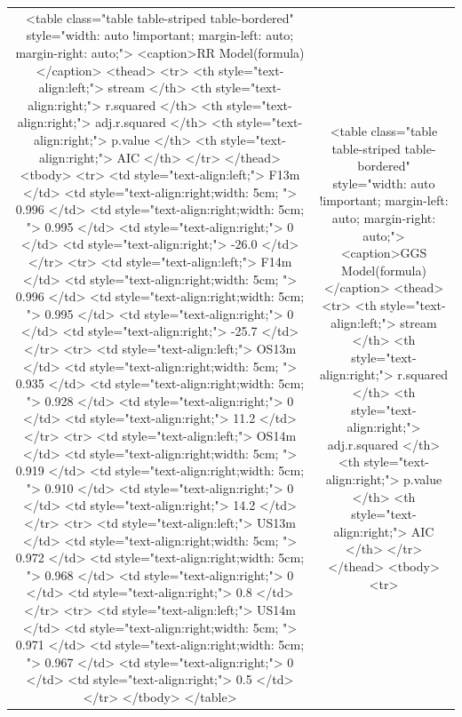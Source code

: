\documentclass[
]{article}
\begin{document}
\begin{center}\begin{tabular}{ c c }<table class="table table-striped table-bordered" style="width: auto !important; margin-left: auto; margin-right: auto;">
<caption>RR Model(formula)</caption>
 <thead>
  <tr>
   <th style="text-align:left;"> stream </th>
   <th style="text-align:right;"> r.squared </th>
   <th style="text-align:right;"> adj.r.squared </th>
   <th style="text-align:right;"> p.value </th>
   <th style="text-align:right;"> AIC </th>
  </tr>
 </thead>
<tbody>
  <tr>
   <td style="text-align:left;"> F13m </td>
   <td style="text-align:right;width: 5cm; "> 0.996 </td>
   <td style="text-align:right;width: 5cm; "> 0.995 </td>
   <td style="text-align:right;"> 0 </td>
   <td style="text-align:right;"> -26.0 </td>
  </tr>
  <tr>
   <td style="text-align:left;"> F14m </td>
   <td style="text-align:right;width: 5cm; "> 0.996 </td>
   <td style="text-align:right;width: 5cm; "> 0.995 </td>
   <td style="text-align:right;"> 0 </td>
   <td style="text-align:right;"> -25.7 </td>
  </tr>
  <tr>
   <td style="text-align:left;"> OS13m </td>
   <td style="text-align:right;width: 5cm; "> 0.935 </td>
   <td style="text-align:right;width: 5cm; "> 0.928 </td>
   <td style="text-align:right;"> 0 </td>
   <td style="text-align:right;"> 11.2 </td>
  </tr>
  <tr>
   <td style="text-align:left;"> OS14m </td>
   <td style="text-align:right;width: 5cm; "> 0.919 </td>
   <td style="text-align:right;width: 5cm; "> 0.910 </td>
   <td style="text-align:right;"> 0 </td>
   <td style="text-align:right;"> 14.2 </td>
  </tr>
  <tr>
   <td style="text-align:left;"> US13m </td>
   <td style="text-align:right;width: 5cm; "> 0.972 </td>
   <td style="text-align:right;width: 5cm; "> 0.968 </td>
   <td style="text-align:right;"> 0 </td>
   <td style="text-align:right;"> 0.8 </td>
  </tr>
  <tr>
   <td style="text-align:left;"> US14m </td>
   <td style="text-align:right;width: 5cm; "> 0.971 </td>
   <td style="text-align:right;width: 5cm; "> 0.967 </td>
   <td style="text-align:right;"> 0 </td>
   <td style="text-align:right;"> 0.5 </td>
  </tr>
</tbody>
</table>
&<table class="table table-striped table-bordered" style="width: auto !important; margin-left: auto; margin-right: auto;">
<caption>GGS Model(formula)</caption>
 <thead>
  <tr>
   <th style="text-align:left;"> stream </th>
   <th style="text-align:right;"> r.squared </th>
   <th style="text-align:right;"> adj.r.squared </th>
   <th style="text-align:right;"> p.value </th>
   <th style="text-align:right;"> AIC </th>
  </tr>
 </thead>
<tbody>
  <tr>

\end{tabular}
\end{center}
\end{document}
